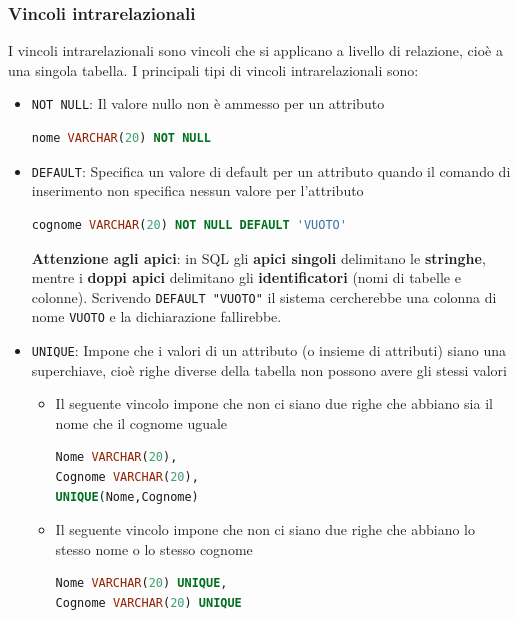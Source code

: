 \documentclass[a4paper,twoside]{article}
\begin{document}
\subsubsection{Vincoli intrarelazionali}
I vincoli intrarelazionali sono vincoli che si applicano a livello di relazione, cioè a
una singola tabella. I principali tipi di vincoli intrarelazionali sono:
\begin{itemize}
  \item \texttt{NOT NULL}: Il valore nullo non è ammesso per un attributo
\begin{lstlisting}[language=SQL, numbers=none]
nome VARCHAR(20) NOT NULL
\end{lstlisting}


  \item \texttt{DEFAULT}: Specifica un valore di default per un attributo quando
    il comando di inserimento non specifica nessun valore per l'attributo

\begin{lstlisting}[language=SQL, numbers=none]
cognome VARCHAR(20) NOT NULL DEFAULT 'VUOTO'
\end{lstlisting}
    \textbf{Attenzione agli apici}: in SQL gli \textbf{apici singoli} delimitano le
    \textbf{stringhe}, mentre i \textbf{doppi apici} delimitano gli
    \textbf{identificatori} (nomi di tabelle e colonne). Scrivendo
    \texttt{DEFAULT "VUOTO"} il sistema cercherebbe una colonna di nome
    \texttt{VUOTO} e la dichiarazione fallirebbe.

  \item \texttt{UNIQUE}: Impone che i valori di un attributo (o insieme di attributi)
    siano una superchiave, cioè righe diverse della tabella non possono avere gli stessi
    valori

    \begin{itemize}
      \item 
        Il seguente vincolo impone che non ci siano due righe che abbiano sia il nome
        che il cognome uguale
\begin{lstlisting}[language=SQL]
Nome VARCHAR(20),
Cognome VARCHAR(20),
UNIQUE(Nome,Cognome)
\end{lstlisting}

    \item 
      Il seguente vincolo impone che non ci siano due righe che abbiano lo stesso
      nome o lo stesso cognome
\begin{lstlisting}[language=SQL]
Nome VARCHAR(20) UNIQUE,
Cognome VARCHAR(20) UNIQUE
\end{lstlisting}
    \end{itemize}


\end{itemize}
\end{document}
